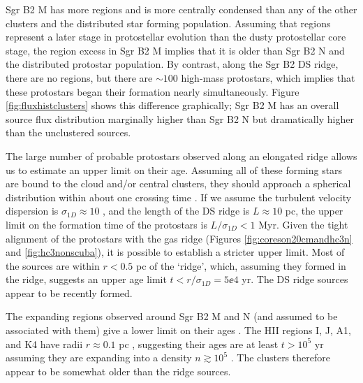 \documentclass[twocolumn]{aastex61}
\begin{document}
Sgr B2 M has more \hii regions and is more centrally condensed than any of the
other clusters and the distributed star forming population.  Assuming that \hii
regions represent a later stage in protostellar evolution than the dusty
protostellar core stage, the \hii region excess in Sgr B2 M implies that it is
older than Sgr B2 N and the distributed protostar population.  By contrast,
along the Sgr B2 DS ridge, there are no \hii regions, but there are $\sim100$
high-mass protostars, which implies that these protostars began their formation
nearly simultaneously.  Figure \ref{fig:fluxhistclusters} shows this difference
graphically; Sgr B2 M has an overall source flux distribution marginally higher
than Sgr B2 N but dramatically higher than the unclustered sources.

The large number of probable protostars observed along an elongated ridge
allows us to estimate an upper limit on their age.  Assuming all of these
forming stars are bound to the cloud and/or central clusters, they should
approach a spherical distribution within about one crossing time
\citep{Efremov1998a}.  If we assume the turbulent velocity dispersion is
$\sigma_{1D}\approx10$ \kms \citep[e.g.,][]{Henshaw2016a}, and the length of
the DS ridge is $L\approx10$ pc, the upper limit on the formation time of the
protostars is $L/\sigma_{1D}<1$ Myr.  Given the tight alignment of the
protostars with the gas ridge (Figures \ref{fig:coreson20cmandhc3n} and
\ref{fig:hc3nonscuba}), it is  possible to establish a stricter upper limit.  Most
of the sources are within $r<0.5$ pc of the `ridge', which, assuming they
formed in the ridge, suggests an upper age limit $t<r/\sigma_{1D}=5\ee{4}$ yr.
The DS ridge sources appear to be recently formed.

The expanding \hii regions observed around Sgr B2 M and N (and assumed to be
associated with them) give a lower limit on their ages \citep[assuming steady
expansion, which may not be a correct model][]{Peters2010b,De-Pree2014a}.  The
HII regions I, J, A1, and K4 have radii $r\approx0.1$ pc \citep{Gaume1995a},
suggesting their ages are at least $t>10^5$ yr assuming they are expanding into
a density $n\gtrsim10^5$ \percc \citep{De-Pree1995a,Schmiedeke2016a}.  The
clusters therefore appear to be somewhat older than the ridge sources.

\end{document}
